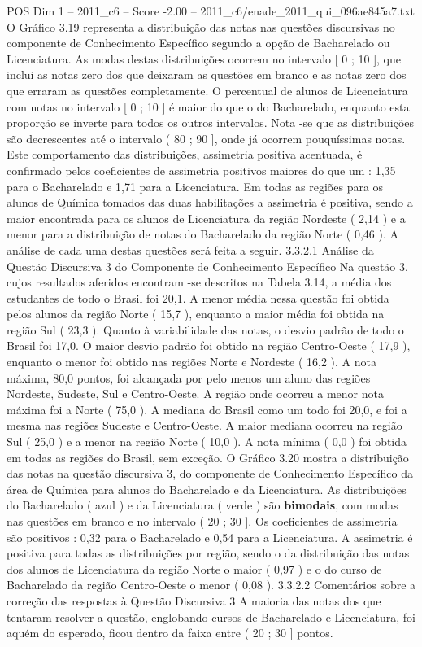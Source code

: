 \begin{textsample}{POS Dim 1 – 2011\_c6 – Score -2.00 – 2011\_c6/enade\_2011\_qui\_096ae845a7.txt}
O Gráfico 3.19 representa a distribuição das notas nas questões discursivas no componente de Conhecimento Específico segundo a opção de Bacharelado ou Licenciatura.
As modas destas distribuições ocorrem no intervalo [ 0 ; 10 ], que inclui as notas zero dos que deixaram as questões em branco e as notas zero dos que erraram as questões completamente.
O percentual de alunos de Licenciatura com notas no intervalo [ 0 ; 10 ] é maior do que o do Bacharelado, enquanto esta proporção se inverte para todos os outros intervalos.
Nota -se que as distribuições são decrescentes até o intervalo ( 80 ; 90 ], onde já ocorrem pouquíssimas notas.
Este comportamento das distribuições, assimetria positiva acentuada, é confirmado pelos coeficientes de assimetria positivos maiores do que um : 1,35 para o Bacharelado e 1,71 para a Licenciatura.
Em todas as regiões para os alunos de Química tomados das duas habilitações a assimetria é positiva, sendo a maior encontrada para os alunos de Licenciatura da região Nordeste ( 2,14 ) e a menor para a distribuição de notas do Bacharelado da região Norte ( 0,46 ).
A análise de cada uma destas questões será feita a seguir. 3.3.2.1 Análise da Questão Discursiva 3 do Componente de Conhecimento Específico Na questão 3, cujos resultados aferidos encontram -se descritos na Tabela 3.14, a média dos estudantes de todo o Brasil foi 20,1.
A menor média nessa questão foi obtida pelos alunos da região Norte ( 15,7 ), enquanto a maior média foi obtida na região Sul ( 23,3 ).
Quanto à variabilidade das notas, o desvio padrão de todo o Brasil foi 17,0.
O maior desvio padrão foi obtido na região Centro-Oeste ( 17,9 ), enquanto o menor foi obtido nas regiões Norte e Nordeste ( 16,2 ).
A nota máxima, 80,0 pontos, foi alcançada por pelo menos um aluno das regiões Nordeste, Sudeste, Sul e Centro-Oeste.
A região onde ocorreu a menor nota máxima foi a Norte ( 75,0 ).
A mediana do Brasil como um todo foi 20,0, e foi a mesma nas regiões Sudeste e Centro-Oeste.
A maior mediana ocorreu na região Sul ( 25,0 ) e a menor na região Norte ( 10,0 ).
A nota mínima ( 0,0 ) foi obtida em todas as regiões do Brasil, sem exceção.
O Gráfico 3.20 mostra a distribuição das notas na questão discursiva 3, do componente de Conhecimento Específico da área de Química para alunos do Bacharelado e da Licenciatura.
As distribuições do Bacharelado ( azul ) e da Licenciatura ( verde ) são \textbf{bimodais}, com modas nas questões em branco e no intervalo ( 20 ; 30 ].
Os coeficientes de assimetria são positivos : 0,32 para o Bacharelado e 0,54 para a Licenciatura.
A assimetria é positiva para todas as distribuições por região, sendo o da distribuição das notas dos alunos de Licenciatura da região Norte o maior ( 0,97 ) e o do curso de Bacharelado da região Centro-Oeste o menor ( 0,08 ). 3.3.2.2 Comentários sobre a correção das respostas à Questão Discursiva 3 A maioria das notas dos que tentaram resolver a questão, englobando cursos de Bacharelado e Licenciatura, foi aquém do esperado, ficou dentro da faixa entre ( 20 ; 30 ] pontos.

\end{textsample}

